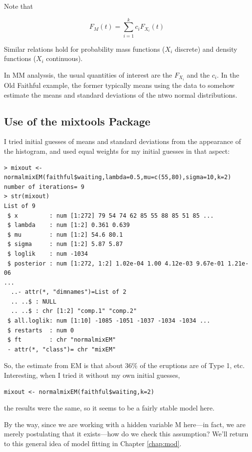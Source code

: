 \documentclass[11pt]{article}
\begin{document}
Note that

\begin{equation}
F_{M}(t) = \sum_{i=1}^k c_i F_{X_i}(t)
\end{equation}

Similar relations hold for probability mass functions ($X_i$ discrete)
and density functions ($X_i$ continuous).

In MM analyssis, the usual quantities of interest are the 
$F_{X_i}$ and the $c_i$.  In the Old Faithful example, the former 
typically means using the data to somehow estimate the means and
standard deviations of the ntwo normal distributions.

\subsection{Use of the mixtools Package}

I tried initial guesses of means and standard deviations from the
appearance of the histogram, and used equal weights for my initial
guesses in that aspect:

\begin{lstlisting}
> mixout <- normalmixEM(faithful$waiting,lambda=0.5,mu=c(55,80),sigma=10,k=2)
number of iterations= 9 
> str(mixout)
List of 9
 $ x         : num [1:272] 79 54 74 62 85 55 88 85 51 85 ...
 $ lambda    : num [1:2] 0.361 0.639
 $ mu        : num [1:2] 54.6 80.1
 $ sigma     : num [1:2] 5.87 5.87
 $ loglik    : num -1034
 $ posterior : num [1:272, 1:2] 1.02e-04 1.00 4.12e-03 9.67e-01 1.21e-06
...
  ..- attr(*, "dimnames")=List of 2
  .. ..$ : NULL
  .. ..$ : chr [1:2] "comp.1" "comp.2"
 $ all.loglik: num [1:10] -1085 -1051 -1037 -1034 -1034 ...
 $ restarts  : num 0
 $ ft        : chr "normalmixEM"
 - attr(*, "class")= chr "mixEM"
\end{lstlisting}

So, the estimate from EM is that about 36\% of the eruptions are of Type
1, etc.  Interesting, when I tried it without my own initial guesses,

\begin{lstlisting}
mixout <- normalmixEM(faithful$waiting,k=2)
\end{lstlisting}

the results were the same, so it seems to be a fairly stable model here.

By the way, since we are working with a hidden variable M here---in
fact, we are merely postulating that it exists---how do we check this
assumption?  We'll return to this general idea of model fitting in
Chapter \ref{chap:mod}.
\end{document}
